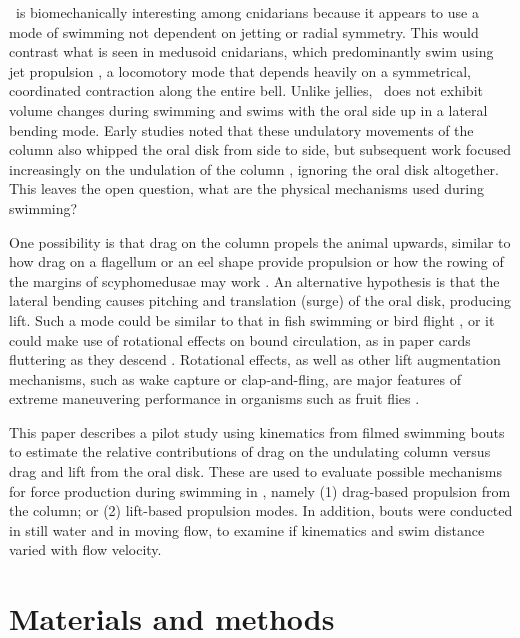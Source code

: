\documentclass{jeb}
\newcommand{\Stomphia}{\Genus{S. coccinea}}
\begin{document}
\Stomphia\ is biomechanically interesting among cnidarians because it appears to use a mode of swimming not dependent on jetting or radial symmetry.  This would contrast what is seen in medusoid cnidarians, which predominantly swim using jet propulsion \citep{Daniel:1982, Daniel:1985, McHenry:2003}, a locomotory mode that depends heavily on a symmetrical, coordinated contraction along the entire bell.  Unlike jellies, \Stomphia\ does not exhibit volume changes during swimming and swims with the oral side up in a lateral bending mode.  Early studies \citep{Yentsch:1955, Sund:1958} noted that these undulatory movements of the column also whipped the oral disk from side to side, but subsequent work focused increasingly on the undulation of the column \citep{Robson:1961, Lawn:1976}, ignoring the oral disk altogether.  This leaves the open question, what are the physical mechanisms used during swimming?  
	
One possibility is that drag on the column propels the animal upwards, similar to how drag on a flagellum or an eel shape provide propulsion \citep{Gray:1955} or how the rowing of the margins of scyphomedusae may work \citep{McHenry:2003}.  An alternative hypothesis is that the lateral bending causes pitching and translation (surge) of the oral disk, producing lift.  Such a mode could be similar to that in fish swimming or bird flight \citep{Vogel:2003, Taylor:2003}, or it could make use of rotational effects on bound circulation, as in paper cards fluttering as they descend \citep{Mahadevan:1999, Pesavento:2004, Andersen:2005, Andersen:2005a}.  Rotational effects, as well as other lift augmentation mechanisms, such as wake capture or clap-and-fling, are major features of extreme maneuvering performance in organisms such as fruit flies \citep{Dickinson:1996}.  
	
This paper describes a pilot study using kinematics from filmed swimming bouts to estimate the relative contributions of drag on the undulating column versus drag and lift from the oral disk.  These are used to evaluate possible mechanisms for force production during swimming in \Stomphia, namely (1) drag-based propulsion from the column;  or (2) lift-based propulsion modes.  In addition, bouts were conducted in still water and in moving flow, to examine if kinematics and swim distance varied with flow velocity.   

\section{Materials and methods}
\end{document}
